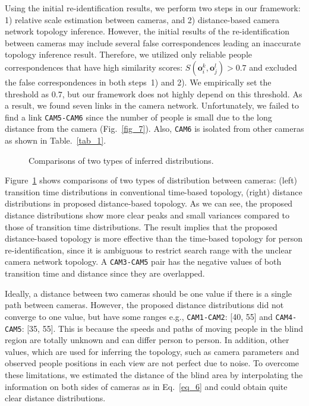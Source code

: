 \documentclass[10pt,twocolumn,letterpaper]{article}
\begin{document}
		Using the initial re-identification results, we perform two steps in our framework: 1) relative scale estimation between cameras, and 2) distance-based camera network topology inference. 
		However, the initial results of the re-identification between cameras may include several false correspondences leading an inaccurate topology inference result.
		Therefore, we utilized only reliable people correspondences that have high similarity scores: $S\left(\mathbf{o}^k_i,\mathbf{o}^l_j\right) > 0.7$ and excluded the false correspondences in both steps~1) and 2). We empirically set the threshold as $0.7$, but our framework does not highly depend on this threshold.
		As a result, we found seven links in the camera network. Unfortunately, we failed to find a link \texttt{CAM5-CAM6} since the number of people is small due to the long distance from the camera (Fig.~\ref{fig_7}). Also, \texttt{CAM6} is isolated from other cameras as shown in Table.~\ref{tab_1}.
		
		\begin{figure}[tbp]	
			\centering
			\caption{Comparisons of two types of inferred distributions.}
			\label{fig_8}
				\vspace{-10pt}
		\end{figure}
		
		
		Figure~\ref{fig_8} shows comparisons of two types of distribution between cameras: (left) transition time distributions in conventional time-based topology, (right) distance distributions in proposed distance-based topology.
		As we can see, the proposed distance distributions show more clear peaks and small variances compared to those of transition time distributions.
		The result implies that the proposed distance-based topology is more effective than the time-based topology for person re-identification, since it is ambiguous to restrict search range with the unclear camera network topology.
		A \texttt{CAM3-CAM5} pair has the negative values of both transition time and distance since they are overlapped.
		
		Ideally, a distance between two cameras should be one value if there is a single path between cameras.
		However, the proposed distance distributions did not converge to one value, but have some ranges e.g., \texttt{CAM1-CAM2}: [40, 55] and \texttt{CAM4-CAM5}: [35, 55].
		This is because the speeds and paths of moving people in the blind region are totally unknown and can differ person to person.	
		In addition, other values, which are used for inferring the topology, such as camera parameters and observed people positions in each view are not perfect due to noise.
		To overcome these limitations, we estimated the distance of the blind area by interpolating the information on both sides of cameras as in Eq.~\eqref{eq_6} and could obtain quite clear distance distributions.
		
\end{document}
